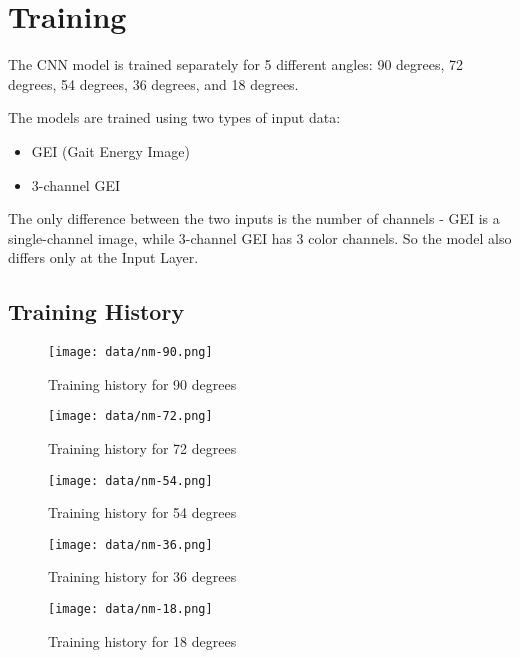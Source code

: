 \section{Training}

The CNN model is trained separately for 5 different angles: 90 degrees, 72 degrees, 54 degrees, 36 degrees, and 18 degrees.

The models are trained using two types of input data:
\begin{itemize}
    \item GEI (Gait Energy Image)
    \item 3-channel GEI
\end{itemize}

The only difference between the two inputs is the number of channels - GEI is a single-channel image, while 3-channel GEI has 3 color channels. So the model also differs only at the Input Layer.

\subsection{Training History}
\begin{figure}[ht]
    \centering
    \texttt{[image: data/nm-90.png]}
    \caption{Training history for 90 degrees}
    \label{fig:nm-90}
\end{figure}

\begin{figure}[ht]
    \centering
    \texttt{[image: data/nm-72.png]}
    \caption{Training history for 72 degrees}
    \label{fig:nm-72}
\end{figure}

\begin{figure}[ht]
    \centering
    \texttt{[image: data/nm-54.png]}
    \caption{Training history for 54 degrees}
    \label{fig:nm-54}
\end{figure}

\begin{figure}[ht]
    \centering
    \texttt{[image: data/nm-36.png]}
    \caption{Training history for 36 degrees}
    \label{fig:nm-36}
\end{figure}

\begin{figure}[ht]
    \centering
    \texttt{[image: data/nm-18.png]}
    \caption{Training history for 18 degrees}
    \label{fig:nm-18}
\end{figure}

